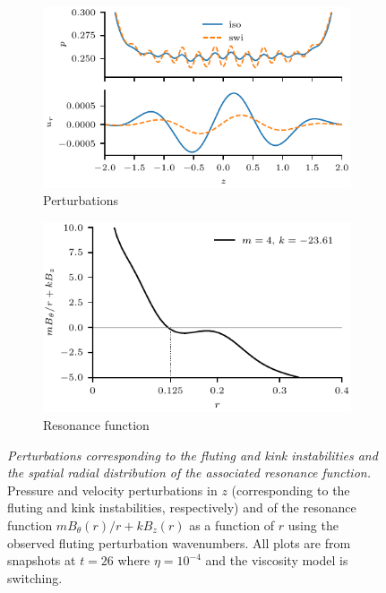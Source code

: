 \documentclass[12pt]{article}
\newcommand{\mycaption}[2]{\caption[#1]{\emph{#1} #2}}
\begin{document}
\begin{figure}[t]
  \centering
    \begin{subfigure}{0.49\textwidth}
      \includegraphics[width=\linewidth]{perturbations_4.pdf}
      \caption{Perturbations}
      \label{fig:pressure_pert_4}
    \end{subfigure}
    \hfill
    \begin{subfigure}{0.49\textwidth}
      \includegraphics[width=\linewidth]{resonant_surface_4.pdf}
      \caption{Resonance function}
      \label{fig:resonant_surface_4}
    \end{subfigure}
\mycaption{Perturbations corresponding to the fluting and kink instabilities and the spatial radial distribution of the associated resonance function.}{Pressure and velocity perturbations in $z$ (corresponding to the fluting and kink instabilities, respectively) and of the resonance function $m B_{\theta}(r)/r + kB_z(r)$ as a function of $r$ using the observed fluting perturbation wavenumbers. All plots are from snapshots at $t=26$ where $\eta=10^{-4}$ and the viscosity model is switching.}
\label{fig:k_and_resonance}%
\end{figure}
\end{document}
